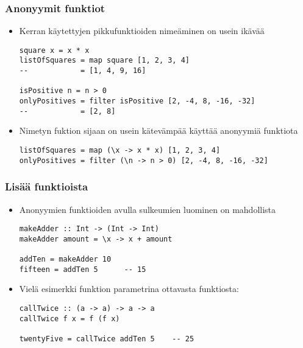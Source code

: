 \documentclass{beamer}
\begin{document}
\begin{frame}[fragile]
\frametitle{Anonyymit funktiot}
\begin{itemize}

\item{Kerran käytettyjen pikkufunktioiden nimeäminen on usein ikävää}
\begin{verbatim}
square x = x * x
listOfSquares = map square [1, 2, 3, 4]
--            = [1, 4, 9, 16]

isPositive n = n > 0
onlyPositives = filter isPositive [2, -4, 8, -16, -32]
--            = [2, 8]
\end{verbatim}

\item{Nimetyn fuktion sijaan on usein kätevämpää käyttää anonyymiä funktiota}
\begin{verbatim}
listOfSquares = map (\x -> x * x) [1, 2, 3, 4]
onlyPositives = filter (\n -> n > 0) [2, -4, 8, -16, -32]
\end{verbatim}
\end{itemize}
\end{frame}

\begin{frame}[fragile]
\frametitle{Lisää funktioista}
\begin{itemize}
\item{Anonyymien funktioiden avulla sulkeumien luominen on mahdollista}
\begin{verbatim}
makeAdder :: Int -> (Int -> Int)
makeAdder amount = \x -> x + amount

addTen = makeAdder 10
fifteen = addTen 5      -- 15
\end{verbatim}

\item{Vielä esimerkki funktion parametrina ottavasta funktiosta:}
\begin{verbatim}
callTwice :: (a -> a) -> a -> a
callTwice f x = f (f x)

twentyFive = callTwice addTen 5    -- 25
\end{verbatim}

\end{itemize}
\end{frame}
\end{document}
